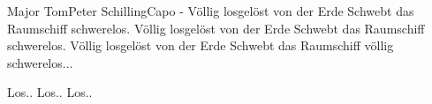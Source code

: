 \begin{song}{Major Tom}{Peter Schilling}{Capo -}
Völlig losgelöst von der Erde
Schwebt das Raumschiff schwerelos.
Völlig losgelöst von der Erde
Schwebt das Raumschiff schwerelos.
Völlig losgelöst von der Erde
Schwebt das Raumschiff völlig schwerelos...

Los..
Los..
Los..                  
\end{song}
